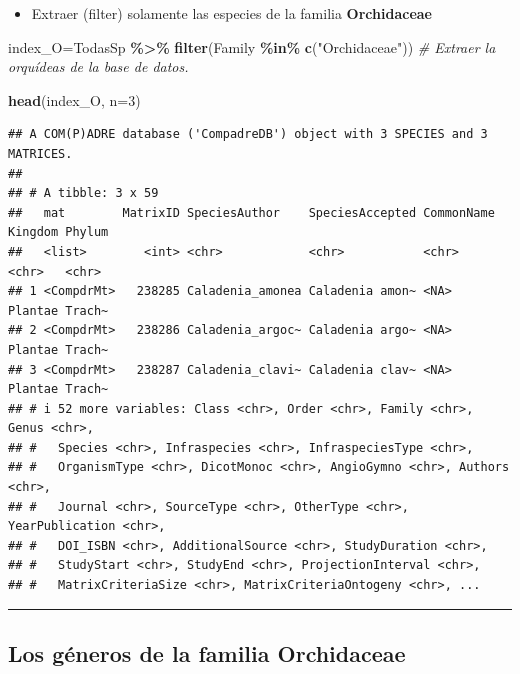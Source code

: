 \documentclass[
]{book}
\newenvironment{Shaded}{\begin{snugshade}}{\end{snugshade}}
\newcommand{\AttributeTok}[1]{\textcolor[rgb]{0.13,0.29,0.53}{#1}}
\newcommand{\CommentTok}[1]{\textcolor[rgb]{0.56,0.35,0.01}{\textit{#1}}}
\newcommand{\DecValTok}[1]{\textcolor[rgb]{0.00,0.00,0.81}{#1}}
\newcommand{\FunctionTok}[1]{\textcolor[rgb]{0.13,0.29,0.53}{\textbf{#1}}}
\newcommand{\NormalTok}[1]{#1}
\newcommand{\OtherTok}[1]{\textcolor[rgb]{0.56,0.35,0.01}{#1}}
\newcommand{\SpecialCharTok}[1]{\textcolor[rgb]{0.81,0.36,0.00}{\textbf{#1}}}
\newcommand{\StringTok}[1]{\textcolor[rgb]{0.31,0.60,0.02}{#1}}
\providecommand{\tightlist}{%
  \setlength{\itemsep}{0pt}\setlength{\parskip}{0pt}}
\theoremstyle{definition}
\theoremstyle{definition}
\theoremstyle{definition}
\theoremstyle{definition}
\theoremstyle{remark}
\begin{document}
\begin{itemize}
\tightlist
\item
  Extraer (filter) solamente las especies de la familia \textbf{Orchidaceae}
\end{itemize}

\begin{Shaded}
\begin{Highlighting}[]
\NormalTok{index\_O}\OtherTok{=}\NormalTok{TodasSp }\SpecialCharTok{\%\textgreater{}\%} 
 \FunctionTok{filter}\NormalTok{(Family }\SpecialCharTok{\%in\%} \FunctionTok{c}\NormalTok{(}\StringTok{"Orchidaceae"}\NormalTok{)) }\CommentTok{\# Extraer la orquídeas de la base de datos. }


\FunctionTok{head}\NormalTok{(index\_O, }\AttributeTok{n=}\DecValTok{3}\NormalTok{)}
\end{Highlighting}
\end{Shaded}

\begin{verbatim}
## A COM(P)ADRE database ('CompadreDB') object with 3 SPECIES and 3 MATRICES.
## 
## # A tibble: 3 x 59
##   mat        MatrixID SpeciesAuthor    SpeciesAccepted CommonName Kingdom Phylum
##   <list>        <int> <chr>            <chr>           <chr>      <chr>   <chr> 
## 1 <CompdrMt>   238285 Caladenia_amonea Caladenia amon~ <NA>       Plantae Trach~
## 2 <CompdrMt>   238286 Caladenia_argoc~ Caladenia argo~ <NA>       Plantae Trach~
## 3 <CompdrMt>   238287 Caladenia_clavi~ Caladenia clav~ <NA>       Plantae Trach~
## # i 52 more variables: Class <chr>, Order <chr>, Family <chr>, Genus <chr>,
## #   Species <chr>, Infraspecies <chr>, InfraspeciesType <chr>,
## #   OrganismType <chr>, DicotMonoc <chr>, AngioGymno <chr>, Authors <chr>,
## #   Journal <chr>, SourceType <chr>, OtherType <chr>, YearPublication <chr>,
## #   DOI_ISBN <chr>, AdditionalSource <chr>, StudyDuration <chr>,
## #   StudyStart <chr>, StudyEnd <chr>, ProjectionInterval <chr>,
## #   MatrixCriteriaSize <chr>, MatrixCriteriaOntogeny <chr>, ...
\end{verbatim}

\begin{center}\rule{0.5\linewidth}{0.5pt}\end{center}

\subsection{Los géneros de la familia Orchidaceae}\label{los-guxe9neros-de-la-familia-orchidaceae}
\end{document}

